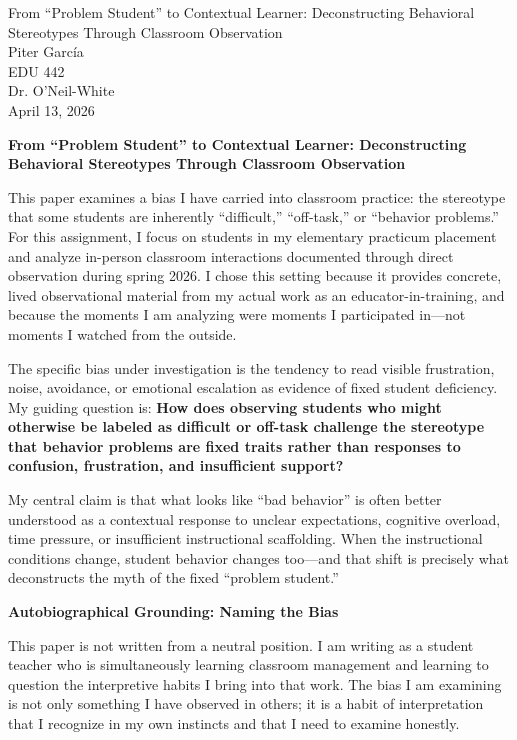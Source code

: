 \documentclass[12pt]{article}
\newcommand{\apaheading}[1]{\begin{center}\textbf{#1}\end{center}}
\begin{document}
\begin{titlepage}
\thispagestyle{fancy}
\begin{center}
From ``Problem Student'' to Contextual Learner: Deconstructing Behavioral Stereotypes Through Classroom Observation\\[2\baselineskip]
Piter Garc\'ia\\
EDU 442\\
Dr. O'Neil-White\\
April 13, 2026
\end{center}
\end{titlepage}

\setcounter{page}{2}

\apaheading{From ``Problem Student'' to Contextual Learner: Deconstructing Behavioral Stereotypes Through Classroom Observation}

This paper examines a bias I have carried into classroom practice: the stereotype that some students are inherently ``difficult,'' ``off-task,'' or ``behavior problems.'' For this assignment, I focus on students in my elementary practicum placement and analyze in-person classroom interactions documented through direct observation during spring 2026. I chose this setting because it provides concrete, lived observational material from my actual work as an educator-in-training, and because the moments I am analyzing were moments I participated in---not moments I watched from the outside.

The specific bias under investigation is the tendency to read visible frustration, noise, avoidance, or emotional escalation as evidence of fixed student deficiency. My guiding question is: \textbf{How does observing students who might otherwise be labeled as difficult or off-task challenge the stereotype that behavior problems are fixed traits rather than responses to confusion, frustration, and insufficient support?}

My central claim is that what looks like ``bad behavior'' is often better understood as a contextual response to unclear expectations, cognitive overload, time pressure, or insufficient instructional scaffolding. When the instructional conditions change, student behavior changes too---and that shift is precisely what deconstructs the myth of the fixed ``problem student.''

\apaheading{Autobiographical Grounding: Naming the Bias}

This paper is not written from a neutral position. I am writing as a student teacher who is simultaneously learning classroom management and learning to question the interpretive habits I bring into that work. The bias I am examining is not only something I have observed in others; it is a habit of interpretation that I recognize in my own instincts and that I need to examine honestly.
\end{document}
